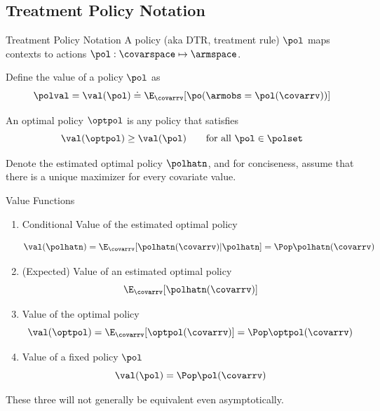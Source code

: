 \documentclass[aspectratio=169, professionalfonts]{beamer}
\begin{document}
\subsection{Treatment Policy Notation}

\begin{frame}{Treatment Policy Notation}
	A policy (aka DTR, treatment rule) $\pol$ maps contexts to actions $\pol:
		\covarspace \mapsto \armspace$.

	\vfill \pause
	Define the value of a policy $\pol$ as
	\begin{equation}
		\polval = \val(\pol) \doteq \E_{\covarrv}[\po(\armobs = \pol(\covarrv))]
	\end{equation}

	\vfill \pause
	An optimal policy $\optpol$ is any policy that satisfies
	\begin{equation}
		\val(\optpol) \geq \val(\pol) \qquad \text{for all }\pol \in \polset
	\end{equation}

	\vfill \pause
	Denote the estimated optimal policy $\polhatn$, and for conciseness, assume
	that there is a unique maximizer for every covariate value.

\end{frame}

\begin{frame}{Value Functions}
	\begin{enumerate}
		\item Conditional Value of the estimated optimal policy

		      $$\val(\polhatn) = \E_{\covarrv}[\polhatn(\covarrv) \vert \polhatn] = \Pop \polhatn(\covarrv)$$

		      \vfill \pause

		\item (Expected) Value of an estimated optimal policy
		      $$\E_{\covarrv}[\polhatn(\covarrv)]$$

		      \vfill \pause

		\item Value of the optimal policy
		      $$\val(\optpol) = \E_{\covarrv}[\optpol(\covarrv)] = \Pop
			      \optpol(\covarrv)$$

		\item Value of a fixed policy $\pol$
		      $$\val(\pol) = \Pop \pol(\covarrv)$$

	\end{enumerate}

	\vfill \pause
	These three will not generally be equivalent even asymptotically.
\end{frame}
\end{document}
